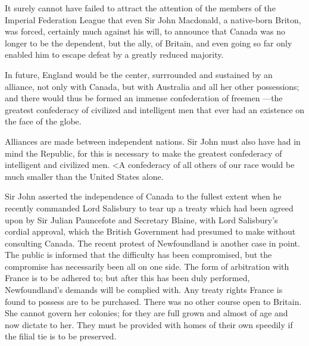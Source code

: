 \documentclass[11pt,openany]{book}
\begin{document}
It surely cannot have failed to attract the attention of the members of the Imperial Federation League that even Sir John Macdonald, a native-born Briton, was forced, certainly much against his will, to announce that Canada was no longer to be the dependent, but the ally, of Britain, and even going so far only enabled him to escape defeat by a greatly reduced majority.

In future, England would be the center, surrrounded and sustained by an alliance, not only with Canada, but with Australia and all her other possessions; and there would thus be formed an immense confederation of freemen ---the greatest confederacy of civilized and intelligent men that ever had an existence on the face of the globe.

Alliances are made between independent nations. Sir John must also have had in mind the Republic, for this is necessary to make the greatest confederacy of intelligent and civilized men. <A confederacy of all others of our race would be much smaller than the United States alone.

Sir John asserted the independence of Canada to the fullest extent when he recently commanded Lord Salisbury to tear up a treaty which had been agreed upon by Sir Julian Pauncefote and Secretary Blaine, with Lord Salisbury's cordial approval, which the British Government had presumed to make without consulting Canada. The recent protest of Newfoundland is another case in point. The public is informed that the difficulty has been compromised, but the compromise has necessarily been all on one side. The form of arbitration with France is to be adhered to; but after this has been duly performed, Newfoundland's demands will be complied with. Any treaty rights France is found to possess are to be purchased. There was no other course open to Britain. She cannot govern her colonies; for they are full grown and almost of age and now dictate to her. They must be provided with homes of their own speedily if the filial tie is to be preserved.
\end{document}
